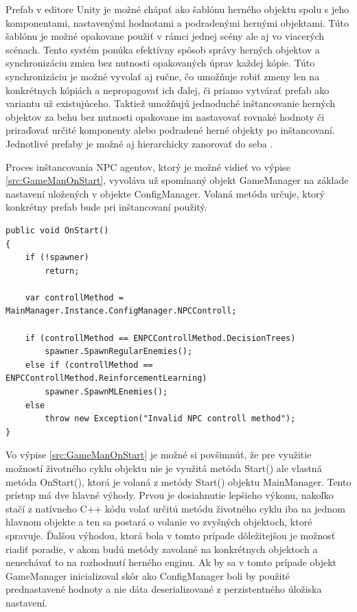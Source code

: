 \documentclass[slovak, master]{diploma}
\begin{document}
Prefab v editore Unity je možné chápať ako šablónu herného objektu spolu s jeho komponentami, nastavenými hodnotami a podradenými hernými objektami. Túto šablónu je možné opakovane použiť v rámci jednej scény ale aj vo viacerých scénach. Tento systém ponúka efektívny spôsob správy herných objektov a synchronizáciu zmien bez nutnosti opakovaných úprav každej kópie. Túto synchronizáciu je možné vyvolať aj ručne, čo umožňuje robiť zmeny len na konkrétnych kópiách a nepropagovať ich ďalej, či priamo vytvárať prefab ako variantu už existujúceho. Taktiež umožňujú jednoduché inštancovanie herných objektov za behu bez nutnosti opakovane im nastavovať rovnaké hodnoty či priraďovať určité komponenty alebo podradené herné objekty po inštancovaní. Jednotlivé prefaby je možné aj hierarchicky zanorovať do seba \cite{Prefabs}.

Proces inštancovania NPC agentov, ktorý je možné vidieť vo výpise \ref{src:GameManOnStart}, vyvoláva už spomínaný objekt GameManager na základe nastavení uložených v objekte ConfigManager. Volaná metóda určuje, ktorý konkrétny prefab bude pri inštancovaní použitý.

\vspace{8pt}
\begin{lstlisting}[label=src:GameManOnStart,caption={Inštancovanie NPC agentov na základe nastavení}]
public void OnStart() 
{
    if (!spawner)
        return;

    var controllMethod = MainManager.Instance.ConfigManager.NPCControll;

    if (controllMethod == ENPCControllMethod.DecisionTrees)
        spawner.SpawnRegularEnemies();
    else if (controllMethod == ENPCControllMethod.ReinforcementLearning)
        spawner.SpawnMLEnemies();
    else
        throw new Exception("Invalid NPC controll method");
}
\end{lstlisting}

Vo výpise \ref{src:GameManOnStart} je možné si povšimnúť, že pre využitie možností životného cyklu objektu nie je využitá metóda Start() ale vlastná metóda OnStart(), ktorá je volaná z metódy Start() objektu MainManager. Tento prístup má dve hlavné výhody. Prvou je dosiahnutie lepšieho výkonu, nakoľko stačí z natívneho C++ kódu volať určitú metódu životného cyklu iba na jednom hlavnom objekte a ten sa postará o volanie vo zvyšných objektoch, ktoré spravuje. Ďalšou výhodou, ktorá bola v tomto prípade dôležitejšou je možnosť riadiť poradie, v akom budú metódy zavolané na konkrétnych objektoch a nenechávať to na rozhodnutí herného enginu. Ak by sa v tomto prípade objekt GameManager inicializoval skôr ako ConfigManager boli by použité prednastavené hodnoty a nie dáta deserializované z perzistentného úložiska nastavení. 
\end{document}
